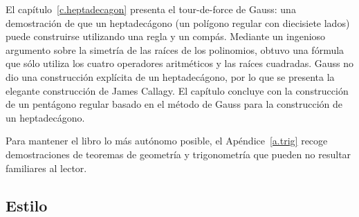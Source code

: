 El capítulo~\ref{c.heptadecagon} presenta el tour-de-force de Gauss: una demostración de que un heptadecágono (un polígono regular con diecisiete lados) puede construirse utilizando una regla y un compás. Mediante un ingenioso argumento sobre la simetría de las raíces de los polinomios, obtuvo una fórmula que sólo utiliza los cuatro operadores aritméticos y las raíces cuadradas. Gauss no dio una construcción explícita de un heptadecágono, por lo que se presenta la elegante construcción de James Callagy. El capítulo concluye con la construcción de un pentágono regular basado en el método de Gauss para la construcción de un heptadecágono.

Para mantener el libro lo más autónomo posible, el Apéndice~\ref{a.trig} recoge demostraciones de teoremas de geometría y trigonometría que pueden no resultar familiares al lector.

\subsection*{Estilo}

